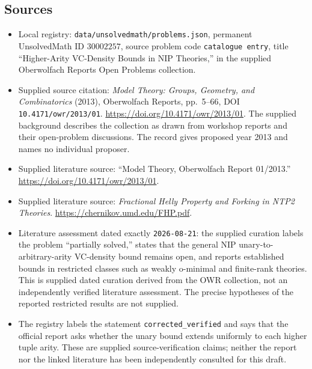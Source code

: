 \documentclass[11pt]{article}
\begin{document}
\subsection{Sources}
\begin{itemize}
\item Local registry: \texttt{data/unsolvedmath/problems.json}, permanent UnsolvedMath ID \(30002257\), source problem code \texttt{catalogue entry}, title ``Higher-Arity VC-Density Bounds in NIP Theories,'' in the supplied Oberwolfach Reports Open Problems collection.
\item Supplied source citation: \emph{Model Theory: Groups, Geometry, and Combinatorics} (2013), Oberwolfach Reports, pp.\ 5--66, DOI \texttt{10.4171/owr/2013/01}. \url{https://doi.org/10.4171/owr/2013/01}. The supplied background describes the collection as drawn from workshop reports and their open-problem discussions. The record gives proposed year 2013 and names no individual proposer.
\item Supplied literature source: ``Model Theory, Oberwolfach Report 01/2013.'' \url{https://doi.org/10.4171/owr/2013/01}.
\item Supplied literature source: \emph{Fractional Helly Property and Forking in NTP2 Theories}. \url{https://chernikov.umd.edu/FHP.pdf}.
\item Literature assessment dated exactly \texttt{2026-08-21}: the supplied curation labels the problem ``partially solved,'' states that the general NIP unary-to-arbitrary-arity VC-density bound remains open, and reports established bounds in restricted classes such as weakly o-minimal and finite-rank theories. This is supplied dated curation derived from the OWR collection, not an independently verified literature assessment. The precise hypotheses of the reported restricted results are not supplied.
\item The registry labels the statement \texttt{corrected\_verified} and says that the official report asks whether the unary bound extends uniformly to each higher tuple arity. These are supplied source-verification claims; neither the report nor the linked literature has been independently consulted for this draft.
\end{itemize}
\end{document}
